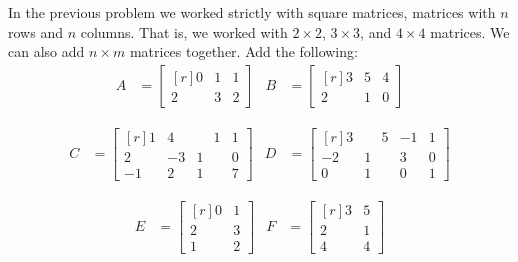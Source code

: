 \documentclass[crop=false,class=article]{standalone}                           %
\begin{document}
        \begin{problem}
            In the previous problem we worked strictly with square matrices,
            matrices with $n$ rows and $n$ columns. That is, we worked with
            $2\times{2}$, $3\times{3}$, and $4\times{4}$ matrices. We can also
            add $n\times{m}$ matrices together. Add the following:
            \begin{align*}
                A&=
                \begin{bmatrix*}[r]
                    0&1&1\\
                    2&3&2
                \end{bmatrix*}
                &
                B&=
                \begin{bmatrix*}[r]
                    3&5&4\\
                    2&1&0
                \end{bmatrix*}
            \end{align*}
            \par\hfill\par
            \begin{align*}
                C&=
                \begin{bmatrix*}[r]
                    1&4&\phantom{\minus}1&1\\
                    2&\minus{3}&1&0\\
                    \minus{1}&2&1&7
                \end{bmatrix*}
                &
                D&=
                \begin{bmatrix*}[r]
                    3&\phantom{\minus}5&\minus{1}&1\\
                    \minus{2}&1&3&0\\
                    0&1&0&1
                \end{bmatrix*}
            \end{align*}
            \par\hfill\par
            \begin{align*}
                E&=
                \begin{bmatrix*}[r]
                    0&1\\
                    2&3\\
                    1&2
                \end{bmatrix*}
                &
                F&=
                \begin{bmatrix*}[r]
                    3&5\\
                    2&1\\
                    4&4
                \end{bmatrix*}
            \end{align*}
        \end{problem}
\end{document}
